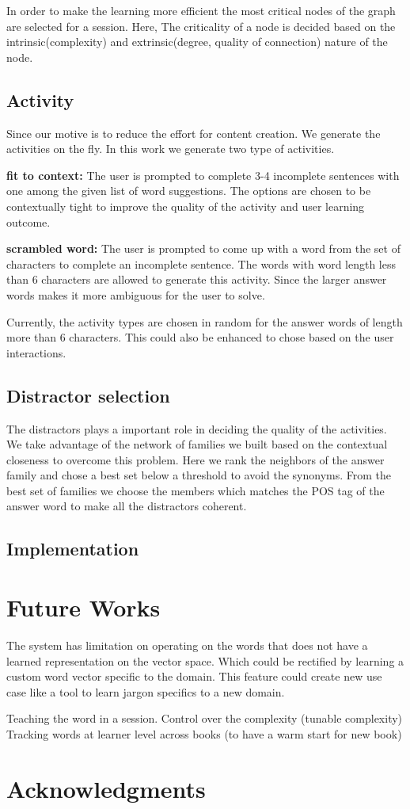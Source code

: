 \documentclass[11pt,a4paper]{article}
\begin{document}
In order to make the learning more efficient the most critical nodes of the
graph are selected for a session. Here, The criticality of a node is decided
based on the intrinsic(complexity) and extrinsic(degree, quality of connection)
nature of the node.


\subsection{Activity}
Since our motive is to reduce the effort for content creation. We generate the
activities on the fly. In this work we generate two type of activities. 

\textbf{fit to context:} The user is prompted to complete 3-4 incomplete
sentences with one among the given list of word suggestions. The options are
chosen to be contextually tight to improve the quality of the activity and
user learning outcome.

\textbf{scrambled word:} The user is prompted to come up with a word from the
set of characters to complete an incomplete sentence. The words with word length
less than 6 characters are allowed to generate this activity. Since the larger
answer words makes it more ambiguous for the user to solve.

Currently, the activity types are chosen in random for the answer words of length
more than 6 characters. This could also be enhanced to chose based on the user
interactions.

\subsection{Distractor selection}
The distractors plays a important role in deciding the quality of the activities.
We take advantage of the network of families we built based on the contextual
closeness to overcome this problem. Here we rank the neighbors of the
answer family and chose a best set below a threshold to avoid the synonyms. From
the best set of families we choose the members which matches the POS tag of the
answer word to make all the distractors coherent.


\subsection{Implementation}

\section{Future Works}
The system has limitation on operating on the words that does not have a learned
representation on the vector space. Which could be rectified by learning a
custom word vector specific to the domain. This feature could create new use case
like a tool to learn jargon specifics to a new domain.

Teaching the word in a session.
Control over the complexity (tunable complexity)
Tracking words at learner level across books (to have a warm start for new book)


\section*{Acknowledgments}



\end{document}
